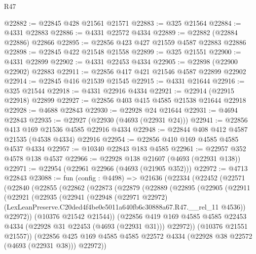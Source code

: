 \begin{lexlean}{R47}
\begin{coremodule}
@22882 := @22845 @428 @21561 @21571
@22883 := @325 @21564
@22884 := @4331 @22883
@22886 := @4331 @22572 @4334
@22889 := @22882 (@22884 @22886) @22866
@22895 := @22856 @423 @427 @21559 @4587 @22883 @22886
@22898 := @22845 @422 @21548 @21558
@22899 := @325 @21551
@22900 := @4331 @22899
@22902 := @4331 @22453 @4334
@22905 := @22898 (@22900 @22902) @22883
@22911 := @22856 @417 @421 @21546 @4587 @22899 @22902
@22914 := @22845 @416 @21539 @21545
@22915 := @4331 @21644
@22916 := @325 @21544
@22918 := @4331 @22916 @4334
@22921 := @22914 (@22915 @22918) @22899
@22927 := @22856 @403 @415 @4585 @21538 @21644 @22918
@22928 := @4688 @22843
@22930 := @22928 @24 @21644
@22931 := @4694 @22843
@22935 := @22927 (@22930 (@4693 (@22931 @24)))
@22941 := @22856 @413 @169 @21536 @4585 @22916 @4334
@22948 := @22844 @408 @412 @4587 @21535 (@4538 @4334) @22916
@22954 := @22856 @410 @169 @4585 @4585 @4537 @4334
@22957 := @10340 @22843 @183 @4585
@22961 := @22957 @352 @4578 @138 @4537
@22966 := @22928 @138 @21607 (@4693 (@22931 @138))
@22971 := @22954 (@22961 @22966 (@4693 (@21905 @352)))
@22972 := @4713 @22843
@23088 := fun (config : @4498) =>
  @21636
    (@22334
      (@22452
        (@22571
          (@22840
            (@22855
              (@22862
                (@22873
                  (@22879
                    (@22889
                      (@22895
                        (@22905
                          (@22911
                            (@22921
                              (@22935
                                (@22941
                                  (@22948
                                    (@22971 @22972)
                                    (LexLeanPreserve.C20ded4f4be0e5011a640fb6c30888a67.R47.__rel_11
                                      @4536))
                                  @22972))
                              (@10376 @21542 @21544))
                            (@22856
                              @419
                              @169
                              @4585
                              @4585
                              @22453
                              @4334
                              (@22928 @31 @22453 (@4693 (@22931 @31)))
                              @22972))
                          (@10376 @21551 @21557))
                        (@22856
                          @425
                          @169
                          @4585
                          @4585
                          @22572
                          @4334
                          (@22928 @38 @22572 (@4693 (@22931 @38)))
                          @22972))

\end{coremodule}
\end{lexlean}
